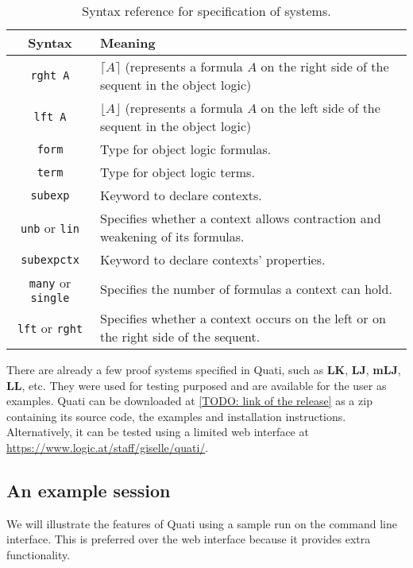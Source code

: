 \documentclass{llncs}
\begin{document}
\begin{table}
\centering
\begin{tabular}{|c|l|}
\hline
Syntax & Meaning \\
\hline
\hline
\texttt{rght A} & $\lceil A \rceil$ (represents a formula $A$ on the right side of the sequent in the object logic)\\
\hline
\texttt{lft A} & $\lfloor A \rfloor$ (represents a formula $A$ on the left side of the sequent in the object logic)\\
\hline
\texttt{form} & Type for object logic formulas.\\
\hline
\texttt{term} & Type for object logic terms.\\
\hline
\texttt{subexp} & Keyword to declare contexts.\\
\hline
\texttt{unb} or \texttt{lin} & Specifies whether a context allows contraction and weakening of its formulas.\\
\hline
\texttt{subexpctx} & Keyword to declare contexts' properties.\\
\hline
\texttt{many} or \texttt{single} & Specifies the number of formulas a context can hold.\\
\hline
\texttt{lft} or \texttt{rght} & Specifies whether a context occurs on the left or on the right side of the sequent.\\
\hline
\end{tabular}
\vspace{0.2cm}
\caption{Syntax reference for specification of systems.}
\label{tbl:syntax}
\end{table}
%
There are already a few proof systems specified in Quati, such as \textbf{LK},
\textbf{LJ}, \textbf{mLJ}, \textbf{LL}, etc. They were used for testing purposed
and are available for the user as examples. Quati can be downloaded at
\url{[TODO: link of the release]} as a zip containing its source code, the
examples and installation instructions. Alternatively, it can be tested using a
limited web interface at \url{https://www.logic.at/staff/giselle/quati/}.

\subsection{An example session}

We will illustrate the features of Quati using a sample run on the command line
interface. This is preferred over the web interface because it provides extra
functionality.
\end{document}
